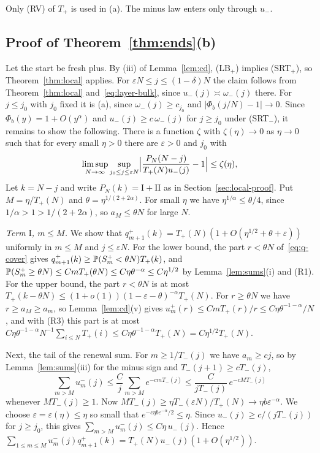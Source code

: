 Only (RV) of $T_\plus$ is used in (a). The minus law enters only through $u_\minus$.

\subsection{Proof of Theorem~\ref{thm:ends}(b)}

Let the start be fresh plus. By (iii) of Lemma~\ref{lem:cd}, (LB$_\plus$) implies
(SRT$_\plus$), so Theorem~\ref{thm:local} applies. For $\varepsilon N\le j\le(1-\delta)N$
the claim follows from Theorem~\ref{thm:local} and~\eqref{eq:layer-bulk}, since
$u_\minus(j)\asymp\omega_\minus(j)$ there. For $j\le j_0$ with $j_0$ fixed it is (a), since
$\omega_\minus(j)\ge c_{j_0}$ and $|\Phi_b(j/N)-1|\to0$. Since $\Phi_b(y)=1+O(y^\alpha)$ and
$u_\minus(j)\ge c\,\omega_\minus(j)$ for $j\ge j_0$ under (SRT$_\minus$), it remains to
show the following. There is a function $\zeta$ with $\zeta(\eta)\to0$ as $\eta\to0$ such
that for every small $\eta>0$ there are $\varepsilon>0$ and $j_0$ with
\begin{equation}\label{eq:middle-layer}
 \limsup_{N\to\infty}\sup_{j_0\le j\le\varepsilon N}
 \Bigl|\frac{P_N(N-j)}{T_{+}(N)u_{-}(j)}-1\Bigr|\le\zeta(\eta),
\end{equation}
Let $k=N-j$ and write $P_N(k)=\mathrm I+\mathrm{II}$ as in Section~\ref{sec:local-proof}.
Put $M=\eta/T_\plus(N)$ and $\theta=\eta^{1/(2+2\alpha)}$. For small $\eta$ we have
$\eta^{1/\alpha}\le\theta/4$, since $1/\alpha>1>1/(2+2\alpha)$, so $a_M\le\theta N$ for large
$N$.

\emph{Term $\mathrm I$, $m\le M$.} We show that
$q^\plus_{m+1}(k)=T_\plus(N)(1+O(\eta^{1/2}+\theta+\varepsilon))$ uniformly in $m\le M$ and
$j\le\varepsilon N$. For the lower bound, the part $r<\theta N$ of~\eqref{eq:q-cover}
gives $q^{+}_{m+1}(k)\ge\mathbb{P}(S^{+}_m<\theta N)T_{+}(k)$, and
$\mathbb{P}(S^{+}_m\ge\theta N)\le CmT_{+}(\theta N)\le C\eta\theta^{-\alpha}\le C\eta^{1/2}$ by
Lemma~\ref{lem:sums}(i) and (R1). For the upper bound, the part $r<\theta N$ is at most
$T_\plus(k-\theta N)\le(1+o(1))(1-\varepsilon-\theta)^{-\alpha}T_\plus(N)$. For $r\ge\theta N$
we have $r\ge a_M\ge a_m$, so Lemma~\ref{lem:cd}(v) gives
$u^\plus_m(r)\le CmT_\plus(r)/r\le C\eta\theta^{-1-\alpha}/N$, and with (R3) this part is at
most $C\eta\theta^{-1-\alpha}N^{-1}\sum_{i\le N}T_\plus(i)\le C\eta\theta^{-1-\alpha}T_\plus(N)=C\eta^{1/2}T_\plus(N)$.

Next, the tail of the renewal sum. For $m\ge1/T_\minus(j)$ we have $a_m\ge cj$, so by
Lemma~\ref{lem:sums}(iii) for the minus sign and $T_\minus(j+1)\ge cT_\minus(j)$,
\[
 \sum_{m>M}u^\minus_m(j)\le\frac Cj\sum_{m>M}e^{-cmT_\minus(j)}
 \le\frac{C}{jT_\minus(j)}\,e^{-cMT_\minus(j)}
\]
whenever $MT_\minus(j)\ge1$. Now
$MT_\minus(j)\ge\eta T_\minus(\varepsilon N)/T_\plus(N)\to\eta b\varepsilon^{-\alpha}$. We choose
$\varepsilon=\varepsilon(\eta)\le\eta$ so small that $e^{-c\eta b\varepsilon^{-\alpha}/2}\le\eta$.
Since $u_\minus(j)\ge c/(jT_\minus(j))$ for $j\ge j_0$, this gives
$\sum_{m>M}u^\minus_m(j)\le C\eta\,u_\minus(j)$. Hence
$\sum_{1\le m\le M}u^\minus_m(j)q^\plus_{m+1}(k)=T_\plus(N)u_\minus(j)(1+O(\eta^{1/2}))$.

